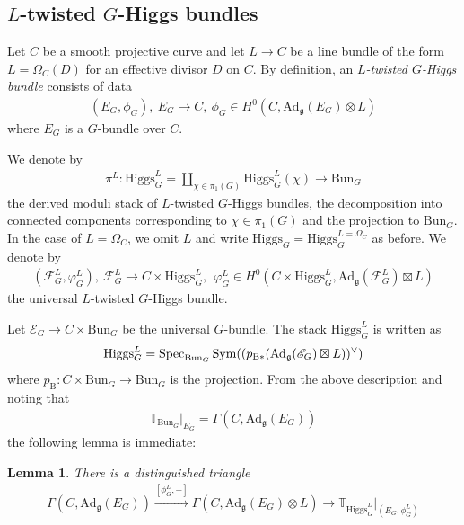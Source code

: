 \documentclass [11pt,oneside,a4paper,mathscr]{amsart}
\newtheorem{lemma}[thm]{Lemma}
\theoremstyle{definition}
\newcommand{\Spec}{\operatorname{Spec}}
\newcommand{\Ad}{\mathrm{Ad}}
\newcommand{\Hig}{\mathrm{Higgs}}
\newcommand{\Bun}{\mathrm{Bun}}
\begin{document}
\subsection{\texorpdfstring{$L$-twisted $G$-Higgs bundles}{L-twisted G-Higgs bundles}}
\label{subsec:sHiggs}
Let $C$ be a smooth projective curve and let $L\to C$ be a line bundle
of the form $L=\Omega_C(D)$ for an effective divisor $D$ on $C$. 
By definition, an \textit{$L$-twisted $G$-Higgs bundle} consists of data
\begin{align*}
    (E_G, \phi_G), \ E_G\to C, \ \phi_G \in H^0(C, \mathrm{Ad}_{\mathfrak{g}}(E_G)\otimes L)
\end{align*}
where $E_G$ is a $G$-bundle over $C$. 

We denote by 
\begin{align}\label{Higgs:pi}
\pi^L \colon 
    \Hig_G^{L}=\coprod_{\chi\in \pi_1(G)}\Hig_G^{L}(\chi) \to \Bun_G
\end{align}
the derived moduli stack of $L$-twisted $G$-Higgs bundles, the 
decomposition into connected components corresponding to $\chi \in \pi_1(G)$
and the projection to $\Bun_G$. 
In the case of $L=\Omega_C$, 
we omit $L$ and write $\Hig_G=\Hig_G^{L=\Omega_C}$ as before. 
We denote by 
\begin{align}\label{univ:G}
    (\mathscr{F}_G^{L}, \varphi_G^{L}), \ \mathscr{F}_G^{L} \to C\times \Hig_G^{L}, \ 
    \ \varphi_G^{L} \in H^0(C\times \Hig_G^{L}, \Ad_{\mathfrak{g}}(\mathscr{F}_G^{L})\boxtimes L)
\end{align}
the universal $L$-twisted $G$-Higgs bundle. 

Let $\mathscr{E}_G \to C\times \Bun_G$ be the universal $G$-bundle. 
The stack $\Hig_G^{L}$ is written as 
\begin{align}\notag
    \Hig_G^{L}=\Spec_{\Bun_G}\mathrm{Sym}((p_{\mathrm{B}\ast}(\mathrm{Ad}_{\mathfrak{g}}(\mathscr{E}_G)\boxtimes L))^{\vee})
\end{align}
where $p_{\mathrm{B}}^{}\colon C\times \Bun_G \to \Bun_G$ is the projection. 
From the above description and noting that 
\begin{align*}\mathbb{T}_{\Bun_G}|_{E_G}=\Gamma(C, \mathrm{Ad}_{\mathfrak{g}}(E_G))
\end{align*}
the following lemma is immediate: 
\begin{lemma}\label{lem:cotangent}
    There is a distinguished triangle 
    \begin{align*}
        \Gamma(C, \mathrm{Ad}_{\mathfrak{g}}(E_G)) \stackrel{[\phi_G^{L}, -]}{\to}
        \Gamma(C, \mathrm{Ad}_{\mathfrak{g}}(E_G)\otimes L)
        \to \mathbb{T}_{\Hig_G^{L}}|_{(E_G, \phi_G^{L})}
    \end{align*}
\end{lemma}
\end{document}
